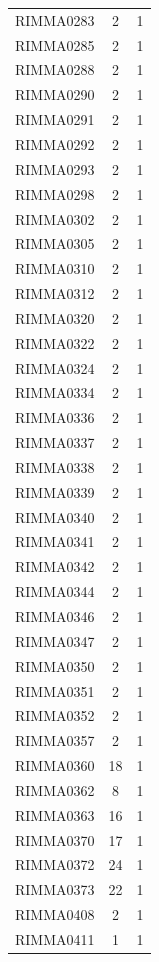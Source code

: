 \documentclass[12pt]{article}
\begin{document}
\begin{table}[htbp]
\begin{tabular}{ccc}
    RIMMA0283 & 2     & 1 \\
    RIMMA0285 & 2     & 1 \\
    RIMMA0288 & 2     & 1 \\
    RIMMA0290 & 2     & 1 \\
    RIMMA0291 & 2     & 1 \\
    RIMMA0292 & 2     & 1 \\
    RIMMA0293 & 2     & 1 \\
    RIMMA0298 & 2     & 1 \\
    RIMMA0302 & 2     & 1 \\
    RIMMA0305 & 2     & 1 \\
    RIMMA0310 & 2     & 1 \\
    RIMMA0312 & 2     & 1 \\
    RIMMA0320 & 2     & 1 \\
    RIMMA0322 & 2     & 1 \\
    RIMMA0324 & 2     & 1 \\
    RIMMA0334 & 2     & 1 \\
    RIMMA0336 & 2     & 1 \\
    RIMMA0337 & 2     & 1 \\
    RIMMA0338 & 2     & 1 \\
    RIMMA0339 & 2     & 1 \\
    RIMMA0340 & 2     & 1 \\
    RIMMA0341 & 2     & 1 \\
    RIMMA0342 & 2     & 1 \\
    RIMMA0344 & 2     & 1 \\
    RIMMA0346 & 2     & 1 \\
    RIMMA0347 & 2     & 1 \\
    RIMMA0350 & 2     & 1 \\
    RIMMA0351 & 2     & 1 \\
    RIMMA0352 & 2     & 1 \\
    RIMMA0357 & 2     & 1 \\
    RIMMA0360 & 18    & 1 \\
    RIMMA0362 & 8     & 1 \\
    RIMMA0363 & 16    & 1 \\
    RIMMA0370 & 17    & 1 \\
    RIMMA0372 & 24    & 1 \\
    RIMMA0373 & 22    & 1 \\
    RIMMA0408 & 2     & 1 \\
    RIMMA0411 & 1     & 1 \\

\end{tabular}
\end{table}
\end{document}
